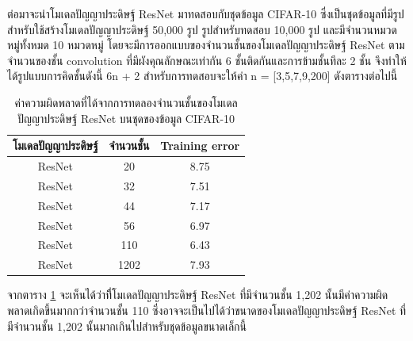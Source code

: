 ต่อมาจะนำโมเดลปัญญาประดิษฐ์ ResNet มาทดสอบกับชุดข้อมูล CIFAR-10 ซึ่งเป็นชุดข้อมูลที่มีรูปสำหรับใช้สร้างโมเดลปัญญาประดิษฐ์ 50,000 รูป รูปสำหรับทดสอบ 10,000 รูป 
และมีจำนวนหมวดหมู่ทั้งหมด 10 หมวดหมู่ โดยจะมีการออกแบบของจำนวนชั้นของโมเดลปัญญาประดิษฐ์ ResNet ตามจำนวนของชั้น convolution 
ที่มีผังคุณลักษณะเท่ากัน 6 ชั้นติดกันและการข้ามชั้นทีละ 2 ชั้น จึงทำให้ได้รูปแบบการคิดชั้นดังนี้ 6n + 2 สำหรับการทดสอบจะให้ค่า n = [3,5,7,9,200] ดังตารางต่อไปนี้

\begin{table}[!ht]
	\centering
	\begin{tabular}{|c|c|c|}
		\hline
		{โมเดลปัญญาประดิษฐ์}		  &{จำนวนชั้น}				    &{Training error}	\\
		\hline
		ResNet						& 20						& 8.75				\\
		ResNet						& 32						& 7.51				\\
		ResNet						& 44						& 7.17				\\
		ResNet						& 56						& 6.97				\\
		ResNet						& 110						& 6.43				\\
		ResNet						& 1202						& 7.93				\\
		\hline
	\end{tabular}
	\caption{ค่าความผิดพลาดที่ได้จากการทดลองจำนวนชั้นของโมเดลปัญญาประดิษฐ์ ResNet บนชุดของข้อมูล CIFAR-10}
	\label{tab: หมวดหมู่ification error}
\end{table}
จากตาราง \ref{tab: หมวดหมู่ification error} จะเห็นได้ว่าที่ีโมเดลปัญญาประดิษฐ์ ResNet ที่มีจำนวนชั้น 1,202 
นั้นมีค่าความผิดพลาดเกิดขึ้นมากกว่าจำนวนชั้น 110 ซึ่งอาจจะเป็นไปได้ว่าขนาดของโมเดลปัญญาประดิษฐ์ ResNet ที่มีจำนวนชั้น 1,202 
นั้นมากเกินไปสำหรับชุดข้อมูลขนาดเล็กนี้